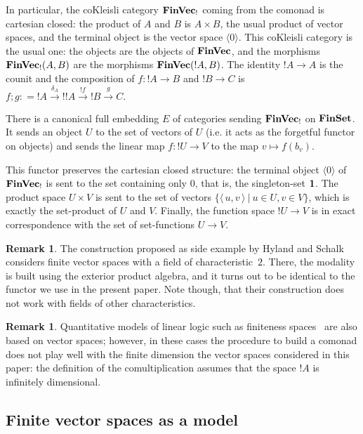 \documentclass[10pt]{article}
\theoremstyle{plain}
\theoremstyle{definition}
\newtheorem{remark}[theorem]{Remark}
\newcommand{\bor}{\ |\ }
\newcommand{\FinSet}{\mbox{\bf FinSet}}
\newcommand{\FinVec}{\mbox{\bf FinVec}}
\newcommand{\pair}[1]{{\langle\,{#1}\,\rangle}}
\newcommand{\tunit}{{\bf 1}}
\newcommand{\defas}{\mathrel{{:}{=}}}
\begin{document}
In particular, the coKleisli category ${\FinVec}_{!}$ coming from the
comonad is cartesian closed: the product of $A$ and $B$ is
${A}\times{B}$, the usual product of vector spaces, and the terminal object is 
the vector space $\langle 0\rangle$.
This coKleisli category is the usual
one: the objects are the objects of ${\FinVec}$, and the morphisms
${\FinVec}_{!}(A,B)$ are the morphisms ${\FinVec}(!A,B)$.  The
identity $!A\to A$ is the counit and the composition of $f:{!A}\to B$
and $!B\to C$ is
$
f;g
\defas
{!A}\xrightarrow{\delta_A}{!!A}\xrightarrow{!f}{!B}\xrightarrow{g}C.
$


There is a canonical full embedding $E$ of categories sending
${\FinVec}_{!}$ on ${\FinSet}$.
It sends an object $U$ to the set of vectors of $U$ (i.e. it acts
as the forgetful functor on objects) and sends the linear map $f:{!U}\to V$ to the map
$v\mapsto f(b_v)$.

This functor preserves the cartesian closed structure: the terminal
object 
$\langle0\rangle$ of
$\FinVec_!$ is sent to the set containing only $0$, that is, the singleton-set
$\tunit$. The product space $U\times V$ is sent to the set of vectors
$\{\pair{u,v}\bor u\in{}U, v\in{}V\}$, which is exactly the set-product of $U$
and $V$. Finally, the function space $!U\to V$ is in exact correspondence with
the set of set-functions $U\to V$.


\begin{remark}\label{rem:ext-prod}
  The construction proposed as side example by Hyland and Schalk~\cite{hyland03glueing} 
  considers finite vector spaces with a field of characteristic~$2$. There,
  the modality is built using the exterior product algebra, and it turns out to
  be identical to the functor we use in the present paper. Note though,
  that their construction does not work with
  fields of other characteristics.
\end{remark}

\begin{remark}
  Quantitative models of linear logic such as finiteness
  spaces~\cite{finiteness} are also based on vector spaces;
  however, in these cases the procedure to build a comonad
  does not play well with the finite dimension the vector spaces
  considered in this paper: the definition of the comultiplication
  assumes that the space $!A$ is infinitely dimensional.
\end{remark}


\subsection{Finite vector spaces as a model}
\label{sec:lc-finvec-model}
\end{document}
